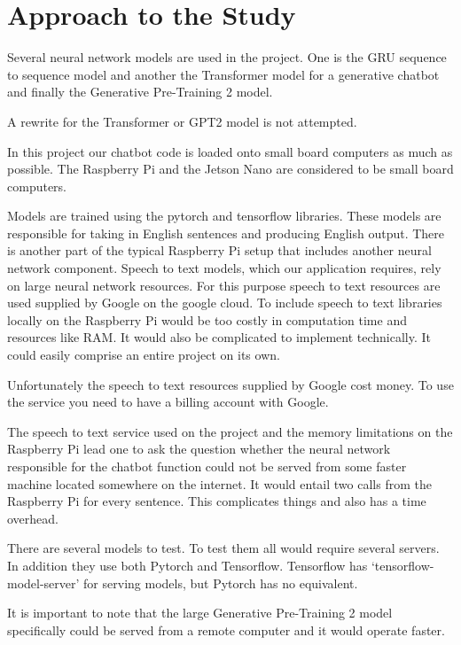 \label{chapter-approach-to-study}

\section{Approach to the Study}

Several neural network models are used in the project. One is the GRU sequence to sequence model and another the Transformer model for a generative chatbot and finally the Generative Pre-Training 2 model.

A rewrite for the Transformer or GPT2 model is not attempted.

In this project our chatbot code is loaded onto small board computers as much as possible. The Raspberry Pi and the Jetson Nano are considered to be small board computers.

Models are trained using the pytorch and tensorflow libraries. These models are responsible for taking in English sentences and producing English output. There is another part of the typical Raspberry Pi setup that includes another neural network component. Speech to text models, which our application requires, rely on large neural network resources. For this purpose speech to text resources are used supplied by Google on the google cloud. To include speech to text libraries locally on the Raspberry Pi would be too costly in computation time and resources like RAM. It would also be complicated to implement technically. It could easily comprise an entire project on its own.

Unfortunately the speech to text resources supplied by Google cost money. To use the service you need to have a billing account with Google.

The speech to text service used on the project and the memory limitations on the Raspberry Pi lead one to ask the question whether the neural network responsible for the chatbot function could not be served from some faster machine located somewhere on the internet. It would entail two calls from the Raspberry Pi for every sentence. This complicates things and also has a time overhead. 

There are several models to test. To test them all would require several servers. In addition they use both Pytorch and Tensorflow. Tensorflow has `tensorflow-model-server' for serving models, but Pytorch has no equivalent.

It is important to note that the large Generative Pre-Training 2 model specifically could be served from a remote computer and it would operate faster. 

